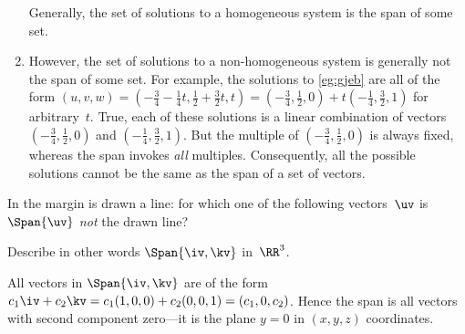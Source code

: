 \begin{example}
\begin{enumerate}
Generally, the set of solutions to a homogeneous system is the span of some set.

\item However, the set of solutions to a non-homogeneous system is generally not the span of some set.  
For example, the solutions to \autoref{eg:gjeb} are all of the form \((u,v,w)=(-\frac34-\frac14t,\frac12+\frac32t,t) 
=(-\frac34,\frac12,0)+t(-\frac14,\frac32,1)\) for arbitrary~\(t\).
True, each of these solutions is a linear combination of vectors \((-\frac34,\frac12,0)\) and \((-\frac14,\frac32,1)\). 
But the multiple of \((-\frac34,\frac12,0)\) is always fixed, whereas the span invokes \emph{all} multiples.
Consequently, all the possible solutions cannot be the same as the span of a set of vectors.


\end{enumerate}
\end{example}



\begin{activity}
In the margin is drawn a line: 
%
for which one of the following vectors~\(\uv\) is \(\Span\{\uv\}\) \emph{not} the drawn line?
\end{activity}



\begin{example} \label{eg:}
Describe in other words \(\Span\{\iv,\kv\}\) in~\(\RR^3\).

\begin{solution} 
All vectors in \(\Span\{\iv,\kv\}\) are of the form
\(c_1\iv+c_2\kv
=c_1(1,0,0)+c_2(0,0,1)
=(c_1,0,c_2)\).
Hence the span is all vectors with second component zero---it is the plane \(y=0\) in \((x,y,z)\) coordinates.
\end{solution}
\end{example}




